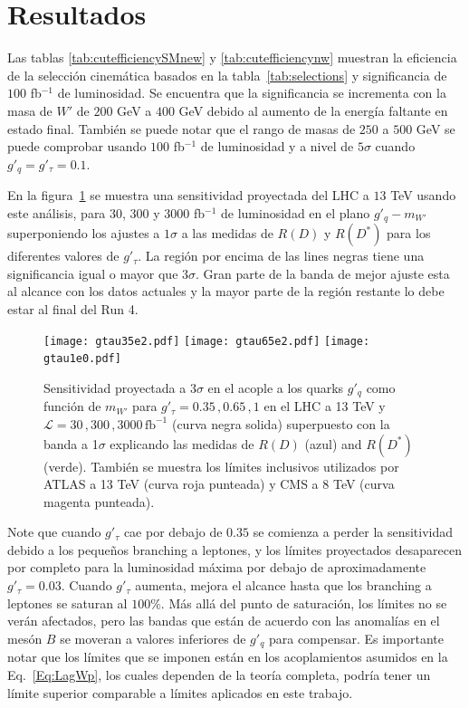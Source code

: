 \section{Resultados}\label{sec:results}

Las tablas \ref{tab:cutefficiencySMnew} y \ref{tab:cutefficiencynw} muestran la eficiencia de la selección cinemática basados en la tabla~\ref{tab:selections} y significancia de $100$ fb$^{-1}$ de luminosidad. Se encuentra que la significancia se incrementa con la masa de $W'$ de $200$ GeV a $400$ GeV debido al aumento de la energía faltante en estado final. También se puede notar que el rango de masas de $250$ a $500$ GeV se puede comprobar  usando $100$ fb$^{-1}$ de luminosidad y a nivel de $5\sigma$ cuando $g'_q=g'_\tau=0.1$.

En la figura~\ref{Fig:limits} se muestra una sensitividad proyectada del LHC a $13$ TeV usando este análisis, para $30$, $300$ y $3000$ fb$^{-1}$ de luminosidad en el plano $g'_q-m_{W'}$ superponiendo los ajustes a $1\sigma$ a las medidas de $R(D)$ y $R(D^{*})$ para los diferentes valores de $g'_\tau$. La región por encima de las lines negras tiene una significancia  igual o mayor que $3\sigma$. Gran parte de la banda de mejor ajuste esta al alcance con los datos actuales y la mayor parte de la región restante lo debe estar al final del Run 4.
%
\begin{figure}
\begin{center}
\texttt{[image: gtau35e2.pdf]}
\texttt{[image: gtau65e2.pdf]}
\texttt{[image: gtau1e0.pdf]}
\caption{Sensitividad proyectada a 3$\sigma$ en el acople a los quarks $g'_q$ como función de $m_{W'}$ para $g'_\tau = 0.35\,,0.65\,,1$ en el LHC a 13 TeV y $\mathcal{L}=30\,, 300\,, 3000\, \text{fb}^{-1}$ (curva negra solida) superpuesto con la banda a 1$\sigma$ explicando las medidas de $R(D)$ (azul) and $R(D^\ast)$ (verde). También se muestra los límites inclusivos utilizados por ATLAS a 13 TeV (curva roja punteada) y CMS a 8 TeV (curva magenta punteada).}
\label{Fig:limits}
\end{center}
\end{figure}
%
Note que cuando $g'_{\tau}$ cae por debajo de $0.35$ se comienza a perder la sensitividad debido a los pequeños branching a leptones, y los límites proyectados desaparecen por completo para la luminosidad máxima por debajo de aproximadamente $g'_{\tau} = 0.03$. Cuando $g'_{\tau}$ aumenta, mejora el alcance hasta que los branching a leptones se saturan al $100\%$. Más allá del punto de saturación, los límites no se verán afectados, pero las bandas que están de acuerdo con las anomalías en el mesón $B$ se moveran a valores inferiores de $g'_q$ para compensar. Es importante notar que los límites que se imponen están en los acoplamientos asumidos en la Eq.~\eqref{Eq:LagWp}, los cuales dependen de la teoría completa, podría tener un límite superior comparable a límites aplicados en este trabajo.

